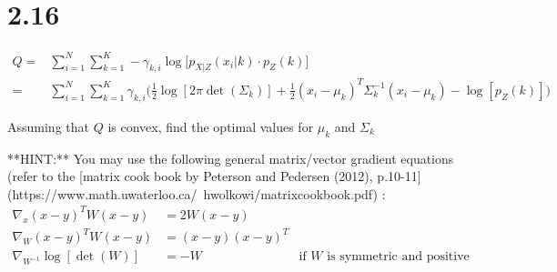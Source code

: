 \documentclass[12pt,paper=a4,twoside]{scrartcl}
\begin{document}
\section*{2.16}
    \begin{align*}
Q = &\sum_{i=1}^N \sum_{k=1}^K -\gamma_{k,i} \log\Big[ p_{X|Z}(x_i|k) \cdot p_Z(k) \Big]\\
=& \sum_{i=1}^N \sum_{k=1}^K \gamma_{k,i} \Big(\frac{1}{2}\log[2\pi \det(\Sigma_k)] + \frac{1}{2} (x_i - \mu_k)^T \Sigma_k^{-1} (x_i - \mu_k) - \log[p_Z(k)]\Big)
\end{align*}

Assuming that $Q$ is convex, find the optimal values for $\mu_k$ and $\Sigma_k$

**HINT:** You may use the following general matrix/vector gradient equations (refer to the [matrix cook book by Peterson and Pedersen (2012), p.10-11](https://www.math.uwaterloo.ca/~hwolkowi/matrixcookbook.pdf) :
\begin{align}
\nabla_x (x - y)^T W (x - y) &= 2 W (x-y) \\
\nabla_W (x - y)^T W (x - y) &= (x-y)(x-y)^T \\
\nabla_{W^{-1}} \log[\det(W)] &= -W & \text{if $W$ is symmetric and positive semi-definite}
\end{align}
\end{document}
